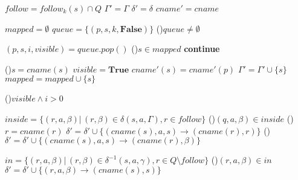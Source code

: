         \begin{algorithm}[h]
            \scriptsize
            \DontPrintSemicolon
            \setcounter{AlgoLine}{0}

            \vspace{0.2cm}
            $follow = follow_k(s) \cap Q$\;
            $\Gamma' = \Gamma$\;
            $\delta' = \delta$\;
            $cname' = cname$\;
            \vspace{0.2cm}

            $mapped = \emptyset$\;
            $queue = \{(p, s, k, \textbf{False})\}$
            \While(){$queue \neq \emptyset$}
            {
                $(p, s, i, visible) = queue.pop()$\;
                \If(){$s \in mapped$}
                {
                    \textbf{continue}\;
                }

                \If(){$s = cname(s)$}
                {
                    $visible = \textbf{True}$\;
                    $cname'(s) = cname'(p)$\;
                    $\Gamma' = \Gamma' \cup \{s\}$\;
                }
                $mapped = mapped \cup \{s\}$\;

                \vspace{0.2cm}

                \If(){$visible \land i > 0$}
                {
                    $inside = \{(r, a, \beta) |\, (r, \beta) \in \delta(s, a, \Gamma), r \in follow\}$\;
                    \ForAll(){$(q, a, \beta) \in inside$}
                    {
                        \eIf(){$r = cname(r)$}
                        {
                            $\delta' = \delta' \cup \{(cname(s), a, s) \rightarrow (cname(r), r)\}$\;
                        }()
                        {
                            $\delta' = \delta' \cup \{(cname(s), a, s) \rightarrow (cname(r), \beta)\}$\;
                        }
                    }

                    $in = \{(r, a, \beta) |\, (r, \beta) \in \delta^{-1}(s, a, \gamma), r \in Q \setminus follow\}$\;
                    \ForAll(){$(r, a, \beta) \in in$}
                    {
                        $\delta' = \delta' \cup \{(r, a, \beta) \rightarrow (cname(s), s)\}$\;
                    }

}}
\end{algorithm}
